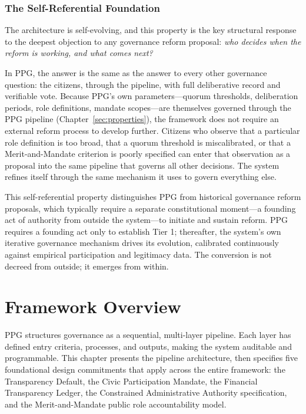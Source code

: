 \documentclass[12pt,a4paper,oneside]{report}
\begin{document}
\subsection{The Self-Referential Foundation}

The architecture is self-evolving, and this property is the key structural response to the deepest objection to any governance reform proposal: \emph{who decides when the reform is working, and what comes next?}

In PPG, the answer is the same as the answer to every other governance question: the citizens, through the pipeline, with full deliberative record and verifiable vote. Because PPG's own parameters---quorum thresholds, deliberation periods, role definitions, mandate scopes---are themselves governed through the PPG pipeline (Chapter~\ref{sec:properties}), the framework does not require an external reform process to develop further. Citizens who observe that a particular role definition is too broad, that a quorum threshold is miscalibrated, or that a Merit-and-Mandate criterion is poorly specified can enter that observation as a proposal into the same pipeline that governs all other decisions. The system refines itself through the same mechanism it uses to govern everything else.

This self-referential property distinguishes PPG from historical governance reform proposals, which typically require a separate constitutional moment---a founding act of authority from outside the system---to initiate and sustain reform. PPG requires a founding act only to establish Tier 1; thereafter, the system's own iterative governance mechanism drives its evolution, calibrated continuously against empirical participation and legitimacy data. The conversion is not decreed from outside; it emerges from within.

\chapter{Framework Overview}
\label{sec:framework}

PPG structures governance as a sequential, multi-layer pipeline. Each layer has defined entry criteria, processes, and outputs, making the system auditable and programmable. This chapter presents the pipeline architecture, then specifies five foundational design commitments that apply across the entire framework: the Transparency Default, the Civic Participation Mandate, the Financial Transparency Ledger, the Constrained Administrative Authority specification, and the Merit-and-Mandate public role accountability model.
\end{document}
